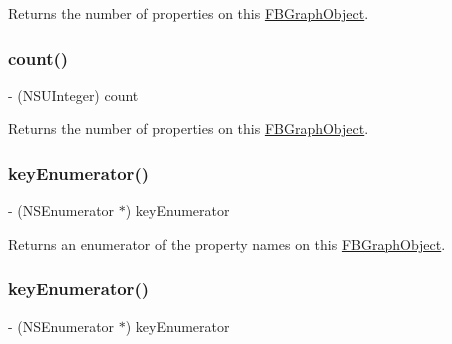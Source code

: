 Returns the number of properties on this {\ttfamily \hyperlink{interfaceFBGraphObject}{F\+B\+Graph\+Object}}. \mbox{\label{protocolFBGraphObject-p_aaf8c8d696ae643db005f3562ab51fca1}} 
\subsubsection{\texorpdfstring{count()}{count()}\hspace{0.1cm}{\footnotesize\ttfamily [5/5]}}
{\footnotesize\ttfamily -\/ (N\+S\+U\+Integer) count \begin{DoxyParamCaption}{ }\end{DoxyParamCaption}}

Returns the number of properties on this {\ttfamily \hyperlink{interfaceFBGraphObject}{F\+B\+Graph\+Object}}. \mbox{\label{protocolFBGraphObject-p_a8df88c6df762bb207cea390c8ef5d048}} 
\subsubsection{\texorpdfstring{key\+Enumerator()}{keyEnumerator()}\hspace{0.1cm}{\footnotesize\ttfamily [1/5]}}
{\footnotesize\ttfamily -\/ (N\+S\+Enumerator $\ast$) key\+Enumerator \begin{DoxyParamCaption}{ }\end{DoxyParamCaption}}

Returns an enumerator of the property names on this {\ttfamily \hyperlink{interfaceFBGraphObject}{F\+B\+Graph\+Object}}. \mbox{\label{protocolFBGraphObject-p_a8df88c6df762bb207cea390c8ef5d048}} 
\subsubsection{\texorpdfstring{key\+Enumerator()}{keyEnumerator()}\hspace{0.1cm}{\footnotesize\ttfamily [2/5]}}
{\footnotesize\ttfamily -\/ (N\+S\+Enumerator $\ast$) key\+Enumerator \begin{DoxyParamCaption}{ }\end{DoxyParamCaption}}

